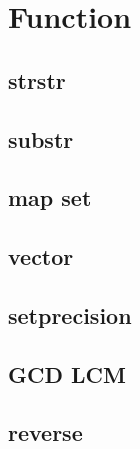 
\section{Function}
        \subsection{strstr}
                
        \subsection{substr}
                
        \subsection{map set}
                
        \subsection{vector}
                
        \subsection{setprecision}
                
        \subsection{GCD LCM}
                
        \subsection{reverse}
                
